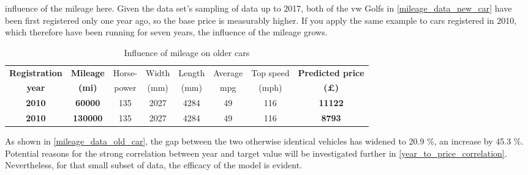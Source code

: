 influence of the mileage here.
Given the data set's sampling of data up to 2017, both of the \ac{vw} Golfs in \autoref{mileage_data_new_car} have been first registered only one year ago, so the base price is measurably higher.
If you apply the same example to cars registered in 2010, which therefore have been running for seven years, the influence of the mileage grows.
\begin{table}[H]
    \begin{adjustbox}{width={\textwidth}}
        \begin{tabular}{|c|c|c|c|c|c|c|c|}
            \hline
            \textbf{Registration} & \textbf{Mileage} & Horse- & Width & Length & Average & Top speed & \textbf{Predicted price} \\[-1ex]
            \textbf{year}         & \textbf{(mi)}    & power  & (mm)  & (mm)   & mpg     & (mph)     & \textbf{(£)}             \\ \hline
            \textbf{2010}         & \textbf{60000}   & 135    & 2027  & 4284   & 49      & 116       & \textbf{11122}           \\\hline
            \textbf{2010}         & \textbf{130000}  & 135    & 2027  & 4284   & 49      & 116       & \textbf{8793}            \\\hline
        \end{tabular}
    \end{adjustbox}
    \caption{Influence of mileage on older cars}
    \label{mileage_data_old_car}
\end{table}
As shown in \autoref{mileage_data_old_car}, the gap between the two otherwise identical vehicles has widened to 20.9 \%, an increase by 45.3 \%.
Potential reasons for the strong correlation between year and target value will be investigated further in \autoref{year_to_price_correlation}.
Nevertheless, for that small subset of data, the efficacy of the model is evident.
